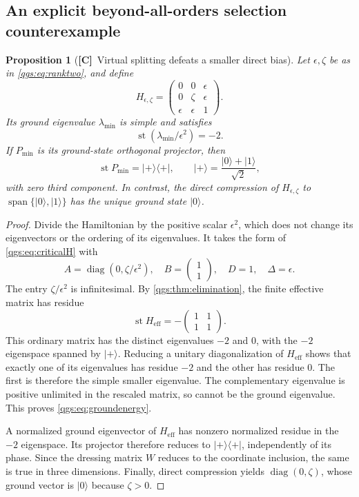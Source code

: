 \documentclass[11pt,oneside]{article}
\numberwithin{equation}{section}
\theoremstyle{plain}
\newtheorem{proposition}[proposition]{Proposition}
\theoremstyle{definition}
\theoremstyle{remark}
\newcommand{\Heff}{H_{\mathrm{eff}}}
\DeclareMathOperator{\st}{st}
\DeclareMathOperator{\diag}{diag}
\DeclareMathOperator{\Span}{span}
\newcommand{\ket}[1]{\lvert#1\rangle}
\newcommand{\bra}[1]{\langle#1\rvert}
\newcommand{\proj}[1]{\ket{#1}\!\bra{#1}}
\newcommand{\TC}{\textcolor{TierC}{\textsf{\bfseries[C]}}}
\begin{document}
\subsection{An explicit beyond-all-orders selection counterexample}
\begin{proposition}[\TC\ Virtual splitting defeats a smaller direct bias]\label{qgs:prop:virtual}
Let $\epsilon,\zeta$ be as in \eqref{qgs:eq:ranktwo}, and define
\begin{equation}\label{qgs:eq:threelevel}
 H_{\epsilon,\zeta}=
 \begin{pmatrix}
 0&0&\epsilon\\
 0&\zeta&\epsilon\\
 \epsilon&\epsilon&1
 \end{pmatrix}.
\end{equation}
Its ground eigenvalue $\lambda_{\min}$ is simple and satisfies
\begin{equation}\label{qgs:eq:groundenergy}
 \st(\lambda_{\min}/\epsilon^2)=-2.
\end{equation}
If $P_{\min}$ is its ground-state orthogonal projector, then
\begin{equation}\label{qgs:eq:groundstate}
 \st P_{\min}=\proj{+},\qquad
 \ket{+}=\frac{\ket{0}+\ket{1}}{\sqrt2},
\end{equation}
with zero third component. In contrast, the direct compression of $H_{\epsilon,\zeta}$ to $\Span\{\ket{0},\ket{1}\}$ has the unique ground state $\ket{0}$.
\end{proposition}
\begin{proof}
Divide the Hamiltonian by the positive scalar $\epsilon^2$, which does not change its eigenvectors or the ordering of its eigenvalues. It takes the form of \eqref{qgs:eq:criticalH} with
\[
 A=\diag(0,\zeta/\epsilon^2),\quad
 B=\begin{pmatrix}1\\1\end{pmatrix},\quad D=1,\quad\Delta=\epsilon.
\]
The entry $\zeta/\epsilon^2$ is infinitesimal. By \cref{qgs:thm:elimination}, the finite effective matrix has residue
\[
 \st\Heff=-\begin{pmatrix}1&1\\1&1\end{pmatrix}.
\]
This ordinary matrix has the distinct eigenvalues $-2$ and $0$, with the $-2$ eigenspace spanned by $\ket{+}$. Reducing a unitary diagonalization of $\Heff$ shows that exactly one of its eigenvalues has residue $-2$ and the other has residue $0$. The first is therefore the simple smaller eigenvalue. The complementary eigenvalue is positive unlimited in the rescaled matrix, so cannot be the ground eigenvalue. This proves \eqref{qgs:eq:groundenergy}.

A normalized ground eigenvector of $\Heff$ has nonzero normalized residue in the $-2$ eigenspace. Its projector therefore reduces to $\proj{+}$, independently of its phase. Since the dressing matrix $W$ reduces to the coordinate inclusion, the same is true in three dimensions. Finally, direct compression yields $\diag(0,\zeta)$, whose ground vector is $\ket{0}$ because $\zeta>0$.
\end{proof}
\end{document}
